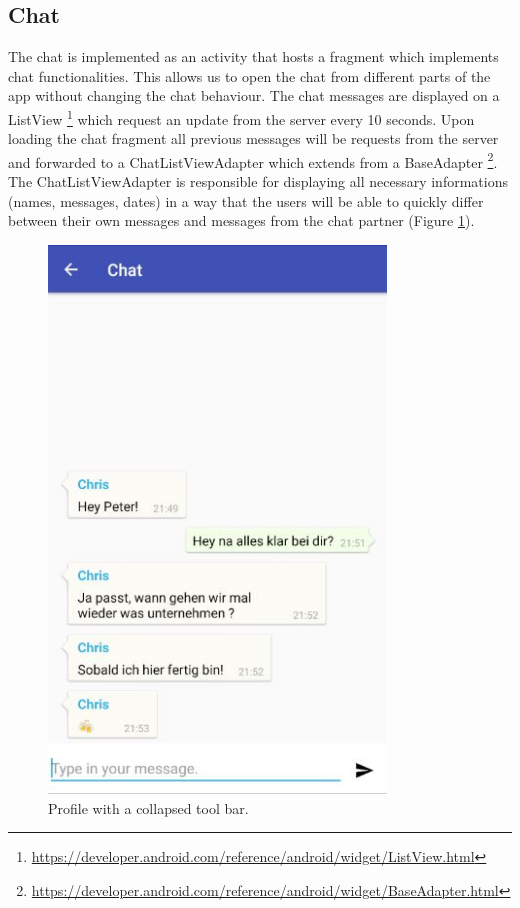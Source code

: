 \subsection{Chat}
The chat is implemented as an activity that hosts a fragment which implements chat functionalities. This allows us to open the chat from different parts of the app without changing the chat behaviour. The chat messages are displayed on a ListView \footnote{\url{https://developer.android.com/reference/android/widget/ListView.html}} which request an update from the server every 10 seconds. Upon loading the chat fragment all previous messages will be requests from the server and forwarded to a ChatListViewAdapter which extends from a BaseAdapter \footnote{\url{https://developer.android.com/reference/android/widget/BaseAdapter.html}}. The ChatListViewAdapter is responsible for displaying all necessary informations (names, messages, dates) in a way that the users will be able to quickly differ between their own messages and messages from the chat partner (Figure \ref{fig:chat}).
\begin{figure}[htbp]
	\includegraphics[width=0.8\textwidth]{images/chat.jpg}
	\centering
	\caption{Profile with a collapsed tool bar.}\label{fig:chat}
\end{figure} 